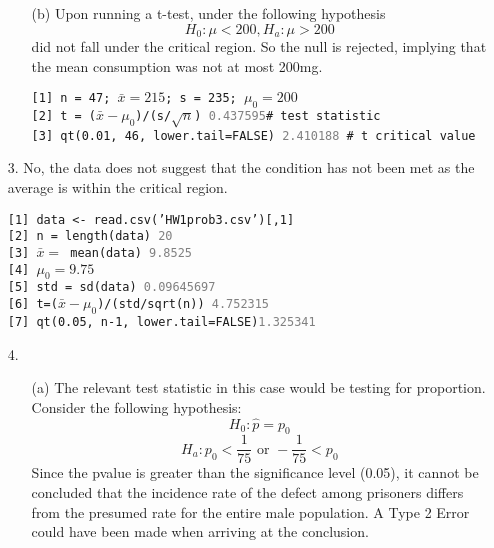 \documentclass[12pt]{article}
\begin{document}
\begin{enumerate}
\begin{enumerate}
			\item[(b)] Upon running a t-test, under the following hypothesis $$H_0: \mu<200, H_a: \mu > 200$$
				did not fall under the critical region. So the null is rejected, implying that the mean consumption 
				was not at most 200mg.
				 \begin{tcolorbox}[colback=white, title=Work, coltitle=white]
					 \texttt{[1] n = 47; $\bar{x} = 215$; s = 235; $\mu_0 = 200$ }\\
					 \texttt{[2] t = ($\bar{x} - \mu_0$)/(s/$\sqrt{n}$) \textcolor{gray}{0.437595}\# test statistic}\\
					 \texttt{[3] qt(0.01, 46, lower.tail=FALSE) \textcolor{gray}{2.410188} \# t critical value}\\
				 \end{tcolorbox}
		\end{enumerate}
	\item[3.] No, the data does not suggest that the condition has not 
		been met as the average is within the critical region.

				 \begin{tcolorbox}[colback=white, title=Work, coltitle=white]
					 \texttt{[1] data <- read.csv('HW1prob3.csv')[,1]}\\
					 \texttt{[2] n = length(data) \textcolor{gray}{20}}\\
					 \texttt{[3] $\bar{x} = $ mean(data) \textcolor{gray}{9.8525}}\\
					 \texttt{[4] $\mu_0 = 9.75$ }\\
					 \texttt{[5] std = sd(data) \textcolor{gray}{0.09645697}}\\
					 \texttt{[6] t=($\bar{x} - \mu_0$)/(std/sqrt(n)) \textcolor{gray}{4.752315}}\\
					 \texttt{[7] qt(0.05, n-1, lower.tail=FALSE)\textcolor{gray}{1.325341}}
				 \end{tcolorbox}
	\item[4.]
		\begin{enumerate}
			\item[(a)] The relevant test statistic in this case would be testing for proportion. 
				Consider the following hypothesis: $$H_0: \hat{p}=p_0 $$
				$$H_a: p_0 < \frac{1}{75} \text{ or } -\frac{1}{75} < p_0$$
				 Since the pvalue is greater than the significance level (0.05), it cannot be 
				 concluded that the incidence rate of the defect among prisoners differs from 
				 the presumed rate for the entire male population. A Type 2 Error could have been made when arriving at the conclusion.


\end{enumerate}
\end{enumerate}
\end{document}
